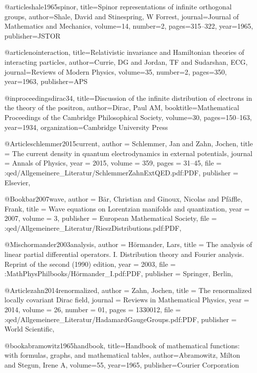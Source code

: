 @article{shale1965spinor,
  title={Spinor representations of infinite orthogonal groups},
  author={Shale, David and Stinespring, W Forrest},
  journal={Journal of Mathematics and Mechanics},
  volume={14},
  number={2},
  pages={315--322},
  year={1965},
  publisher={JSTOR}
}


@article{nointeraction,
  title={Relativistic invariance and Hamiltonian theories of interacting particles},
  author={Currie, DG and Jordan, TF and Sudarshan, ECG},
  journal={Reviews of Modern Physics},
  volume={35},
  number={2},
  pages={350},
  year={1963},
  publisher={APS}
}

@inproceedings{dirac34,
  title={Discussion of the infinite distribution of electrons in the theory of the positron},
  author={Dirac, Paul AM},
  booktitle={Mathematical Proceedings of the Cambridge Philosophical Society},
  volume={30},
  pages={150--163},
  year={1934},
  organization={Cambridge University Press}
}

@Article{schlemmer2015current,
  author    = {Schlemmer, Jan and Zahn, Jochen},
  title     = {The current density in quantum electrodynamics in external potentials},
  journal   = {Annals of Physics},
  year      = {2015},
  volume    = {359},
  pages     = {31--45},
  file      = {:qed/Allgemeinere_Literatur/SchlemmerZahnExtQED.pdf:PDF},
  publisher = {Elsevier},
}


@Book{bar2007wave,
  author    = {B{\"a}r, Christian and Ginoux, Nicolas and Pf{\"a}ffle, Frank},
  title     = {Wave equations on Lorentzian manifolds and quantization},
  year      = {2007},
  volume    = {3},
  publisher = {European Mathematical Society},
  file      = {:qed/Allgemeinere_Literatur/RieszDistributions.pdf:PDF},
}


@Misc{hormander2003analysis,
  author    = {H{\"o}rmander, Lars},
  title     = {The analysis of linear partial differential operators. I. Distribution theory and Fourier analysis. Reprint of the second (1990) edition},
  year      = {2003},
  file      = {:MathPhysPhilbooks/Hörmander_I.pdf:PDF},
  publisher = {Springer, Berlin},
}


@Article{zahn2014renormalized,
  author    = {Zahn, Jochen},
  title     = {The renormalized locally covariant Dirac field},
  journal   = {Reviews in Mathematical Physics},
  year      = {2014},
  volume    = {26},
  number    = {01},
  pages     = {1330012},
  file      = {:qed/Allgemeinere_Literatur/HadamardGaugeGroups.pdf:PDF},
  publisher = {World Scientific},
}

@book{abramowitz1965handbook,
  title={Handbook of mathematical functions: with formulas, graphs, and mathematical tables},
  author={Abramowitz, Milton and Stegun, Irene A},
  volume={55},
  year={1965},
  publisher={Courier Corporation}
}

